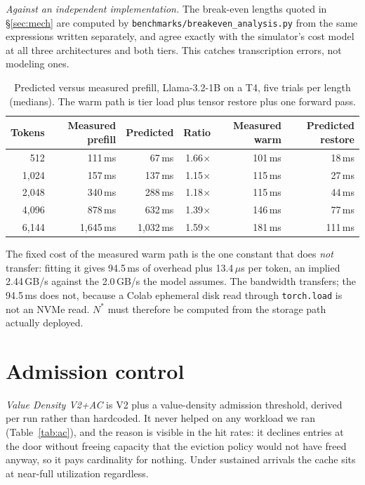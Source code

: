 \documentclass{article}
\begin{document}
\emph{Against an independent implementation.} The break-even lengths quoted in
\S\ref{sec:mech} are computed by \texttt{benchmarks/breakeven\_analysis.py} from the same
expressions written separately, and agree exactly with the simulator's cost model at all
three architectures and both tiers. This catches transcription errors, not modeling ones.

\begin{table}[h]
\centering
\caption{Predicted versus measured prefill, Llama-3.2-1B on a T4, five trials per length
(medians). The warm path is tier load plus tensor restore plus one forward pass.}
\label{tab:costval}
\small
\begin{tabular}{@{}rrrrrr@{}}
\toprule
Tokens & Measured prefill & Predicted & Ratio & Measured warm & Predicted restore \\
\midrule
512    & 111\,ms   & 67\,ms    & 1.66$\times$ & 101\,ms & 18\,ms \\
1{,}024 & 157\,ms   & 137\,ms   & 1.15$\times$ & 115\,ms & 27\,ms \\
2{,}048 & 340\,ms   & 288\,ms   & 1.18$\times$ & 115\,ms & 44\,ms \\
4{,}096 & 878\,ms   & 632\,ms   & 1.39$\times$ & 146\,ms & 77\,ms \\
6{,}144 & 1{,}645\,ms & 1{,}032\,ms & 1.59$\times$ & 181\,ms & 111\,ms \\
\bottomrule
\end{tabular}
\end{table}

The fixed cost of the measured warm path is the one constant that does \emph{not}
transfer: fitting it gives 94.5\,ms of overhead plus 13.4\,$\mu$s per token, an implied
2.44\,GB/s against the 2.0\,GB/s the model assumes. The bandwidth transfers; the 94.5\,ms
does not, because a Colab ephemeral disk read through \texttt{torch.load} is not an NVMe
read. $N^{*}$ must therefore be computed from the storage path actually deployed.

\section{Admission control}
\label{app:ac}

\emph{Value Density V2+AC} is V2 plus a value-density admission threshold, derived per run
rather than hardcoded. It never helped on any workload we ran (Table~\ref{tab:ac}), and
the reason is visible in the hit rates: it declines entries at the door without freeing
capacity that the eviction policy would not have freed anyway, so it pays cardinality for
nothing. Under sustained arrivals the cache sits at near-full utilization regardless.
\end{document}
